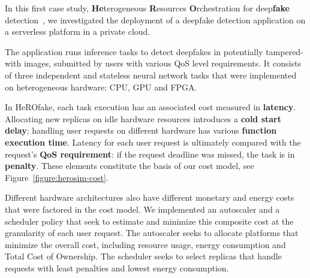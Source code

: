 In this first case study, \textbf{He}terogeneous \textbf{R}esources \textbf{O}rchestration for deep\textbf{fake} detection~\cite{herofake}, we investigated the deployment of a deepfake detection application on a serverless platform in a private cloud. %

The application runs inference tasks to detect deepfakes in potentially tampered-with images, submitted by users with various QoS level requirements. %
It consists of three independent and stateless neural network tasks that were implemented on heterogeneous hardware: CPU, GPU and FPGA. %


In HeROfake, each task execution has an associated cost measured in \textbf{latency}. Allocating new replicas on idle hardware resources introduces a \textbf{cold start delay}; handling user requests on different hardware has various \textbf{function execution time}. Latency for each user request is ultimately compared with the request's \textbf{QoS requirement}: if the request deadline was missed, the task is in \textbf{penalty}. These elements constitute the basis of our cost model, see Figure~\ref{figure:herosim-cost}.


Different hardware architectures also have different monetary and energy costs that were factored in the cost model. We implemented an autoscaler and a scheduler policy that seek to estimate and minimize this composite cost at the granularity of each user request. The autoscaler seeks to allocate platforms that minimize the overall cost, including resource usage, energy consumption and Total Cost of Ownership. The scheduler seeks to select replicas that handle requests with least penalties and lowest energy consumption.

